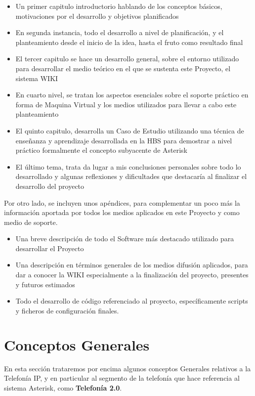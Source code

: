 \begin{itemize}
	\item Un primer capitulo introductorio hablando de los conceptos básicos, motivaciones por el desarrollo y objetivos planificados
	\item En segunda instancia, todo el desarrollo a nivel de planificación, y el planteamiento desde el inicio de la idea, hasta el fruto como resultado final
	\item El tercer capitulo se hace un desarrollo general, sobre el entorno utilizado para desarrollar el medio teórico en el que se sustenta este Proyecto, el sistema WIKI
	\item En cuarto nivel, se tratan los aspectos esenciales sobre el soporte práctico en forma de Maquina Virtual y los medios utilizados para llevar a cabo este planteamiento
	\item El quinto capitulo, desarrolla un Caso de Estudio utilizando una técnica de enseñanza y aprendizaje desarrollada en la HBS para demostrar a nivel práctico formalmente el concepto subyacente de Asterisk
	\item El último tema, trata da lugar a mis conclusiones personales sobre todo lo desarrollado y algunas reflexiones y dificultades que destacaría al finalizar el desarrollo del proyecto
\end{itemize}

Por otro lado, se incluyen unos apéndices, para complementar un poco más la información aportada por todos los medios aplicados en este Proyecto y como medio de soporte.

\begin{itemize}
	\item Una breve descripción de todo el Software más destacado utilizado para desarrollar el Proyecto
	\item Una descripción en términos generales de los medios difusión aplicados, para dar a conocer la WIKI especialmente a la finalización del proyecto, presentes y futuros estimados
	\item Todo el desarrollo de código referenciado al proyecto, específicamente scripts y ficheros de configuración finales.
\end{itemize}

\section{Conceptos Generales}

En esta sección trataremos por encima algunos conceptos Generales relativos a la Telefonía IP, y en particular al segmento de la telefonía que hace referencia al sistema Asterisk, como \textbf{Telefonía 2.0}.

